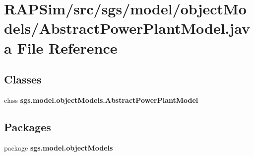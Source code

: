 \section{R\-A\-P\-Sim/src/sgs/model/object\-Models/\-Abstract\-Power\-Plant\-Model.java File Reference}
\label{_abstract_power_plant_model_8java}
\subsection*{Classes}
\begin{DoxyCompactItemize}
\item 
class {\bf sgs.\-model.\-object\-Models.\-Abstract\-Power\-Plant\-Model}
\end{DoxyCompactItemize}
\subsection*{Packages}
\begin{DoxyCompactItemize}
\item 
package {\bf sgs.\-model.\-object\-Models}
\end{DoxyCompactItemize}
